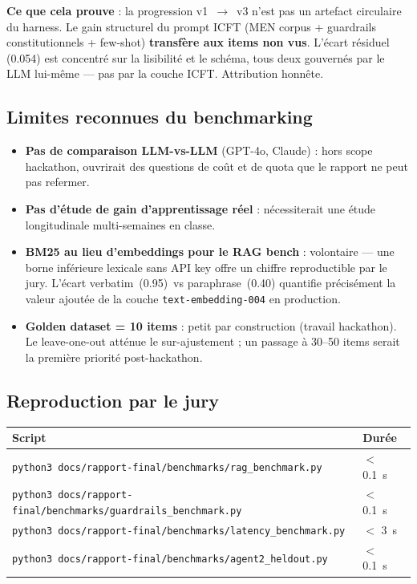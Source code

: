 \documentclass[11pt,a4paper]{article}
\begin{document}
\textbf{Ce que cela prouve} : la progression v1~$\to$~v3 n'est pas un artefact
circulaire du harness. Le gain structurel du prompt ICFT (MEN corpus +
guardrails constitutionnels + few-shot) \textbf{transfère aux items non vus}.
L'écart résiduel (0.054) est concentré sur la lisibilité et le schéma, tous
deux gouvernés par le LLM lui-même --- pas par la couche ICFT. Attribution
honnête.

\subsection{Limites reconnues du benchmarking}

\begin{itemize}[leftmargin=1.2em,itemsep=2pt,topsep=2pt]
  \item \textbf{Pas de comparaison LLM-vs-LLM} (GPT-4o, Claude) : hors scope
        hackathon, ouvrirait des questions de coût et de quota que le rapport
        ne peut pas refermer.
  \item \textbf{Pas d'étude de gain d'apprentissage réel} : nécessiterait une
        étude longitudinale multi-semaines en classe.
  \item \textbf{BM25 au lieu d'embeddings pour le RAG bench} : volontaire ---
        une borne inférieure lexicale sans API key offre un chiffre
        reproductible par le jury. L'écart verbatim~(0.95)~vs
        paraphrase~(0.40) quantifie précisément la valeur ajoutée de la
        couche \texttt{text-embedding-004} en production.
  \item \textbf{Golden dataset = 10 items} : petit par construction (travail
        hackathon). Le leave-one-out atténue le sur-ajustement ; un passage à
        30--50 items serait la première priorité post-hackathon.
\end{itemize}

\subsection{Reproduction par le jury}

\begin{center}
\footnotesize
\begin{tabular}{@{}ll@{}}
\toprule
\textbf{Script} & \textbf{Durée} \\
\midrule
\texttt{python3 docs/rapport-final/benchmarks/rag\_benchmark.py}        & $<$ 0.1~s \\
\texttt{python3 docs/rapport-final/benchmarks/guardrails\_benchmark.py} & $<$ 0.1~s \\
\texttt{python3 docs/rapport-final/benchmarks/latency\_benchmark.py}    & $<$ 3~s \\
\texttt{python3 docs/rapport-final/benchmarks/agent2\_heldout.py}       & $<$ 0.1~s \\
\bottomrule
\end{tabular}
\end{center}
\end{document}
